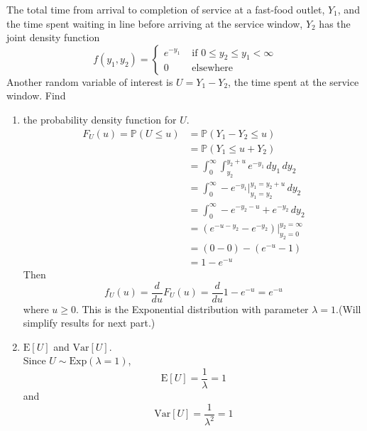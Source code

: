 \documentclass[12pt]{article}
\newcommand{\ques}[1]{\noindent {\bf Question #1: }}
\newcommand{\prob}[1]{\mathbb{P}(#1)}
\newcommand{\var}[1]{\mathrm{Var}[#1]}
\newcommand{\expe}[1]{\mathrm{E}[#1]}
\begin{document}
\ques{6.10} The total time from arrival to completion of service at a fast-food outlet, $Y_1$, and the time spent waiting in line before arriving at the service window, $Y_2$ has the joint density function $$ f(y_1, y_2) = \begin{cases} e^{-y_1} &\text{ if } 0 \leq y_2 \leq y_1 < \infty \\ 0 &\text{ elsewhere } \end{cases} $$ 
Another random variable of interest is $U = Y_1 - Y_2$, the time spent at the service window. Find 
\begin{enumerate} 
\item the probability density function for $U$. 
$$ \begin{aligned} 
F_U(u) = \prob{U \leq u} &= \prob{Y_1 - Y_2 \leq u} \\ &= \prob{Y_1 \leq u + Y_2} \\ &= \int_0^\infty \int_{y_2}^{y_2 + u} e^{-y_1} \, dy_1\, dy_2 \\ &= \int_0^\infty -e^{-y_1}\Bigg|_{y_1 = y_2}^{y_1 = y_2 + u} \, dy_2 \\ &= \int_0^\infty -e^{-y_2 - u} + e^{-y_2} \, dy_2 \\ &= (e^{-u - y_2} - e^{-y_2})\Bigg|_{y_2 = 0}^{y_2 = \infty} \\ &= (0 - 0) - (e^{-u} - 1) \\ &= 1 - e^{-u} \end{aligned} $$ Then 
$$ f_U(u) = \frac{d}{du} F_U(u) = \frac{d}{du} 1 - e^{-u} = e^{-u} $$ where $u \geq 0$. This is the Exponential distribution with parameter $\lambda = 1$.(Will simplify results for next part.)
\item $\expe{U}$ and $\var{U}$. \\
Since $U \sim \text{Exp}(\lambda = 1)$, $$ \expe{U} = \frac{1}{\lambda} = 1 $$ and $$ \var{U} = \frac{1}{\lambda^2} = 1 $$ 
\end{enumerate} 
\end{document}
